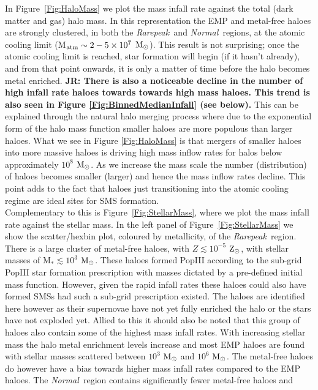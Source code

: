 \documentclass[twocolumn,iop,revtex4]{openjournal}
\newcommand{\msolar} {$\rm{M_{\odot}}~$}
\newcommand{\msolarc} {$\rm{M_{\odot}}$}
\newcommand{\zsolarc} {$\rm{Z_{\odot}}$}
\newcommand{\rarepeak} {\textit{Rarepeak~}}
\newcommand{\normal} {\textit{Normal~}}
\def\jr#1{{\color{blue} \bf JR:  #1}}
\begin{document}
In Figure~\ref{Fig:HaloMass} we plot the mass infall rate against the total (dark matter
and gas) halo mass. In this representation the EMP and metal-free haloes are strongly clustered, in both
the \rarepeak and \normal regions, at the atomic cooling limit (M$_{\rm atm} \sim 2 - 5 \times 10^7$
\msolarc). This result is not surprising; once the atomic cooling limit is reached, star formation
will begin (if it hasn't already), and from that point onwards, it is only a matter of time before
the halo becomes metal enriched. \jr{There is also a noticeable decline in the number of high infall rate
haloes towards towards high mass haloes. This trend is also seen in Figure \ref{Fig:BinnedMedianInfall} (see below).}
This can be explained through the natural halo merging process where due to the exponential form of the halo mass
function smaller haloes are more populous than larger haloes. What we see in Figure \ref{Fig:HaloMass} is that mergers of smaller haloes
into more massive haloes is driving high mass inflow rates for halos below approximately $10^{8}$ \msolarc. As we increase the mass
scale the number (distribution) of haloes becomes smaller (larger) and hence the mass inflow rates decline. This point adds to
the fact that haloes just transitioning into the atomic cooling regime are ideal sites for SMS formation. \\
\indent Complementary to this is Figure~\ref{Fig:StellarMass}, 
where we plot the mass infall rate against the stellar mass. In the left panel of Figure~\ref{Fig:StellarMass}
we show the scatter/hexbin plot, coloured by metallicity, of the
\rarepeak region. There is a large cluster of metal-free haloes, with $Z \lesssim 10^{-5}$ \zsolarc,
with stellar masses of M$_{*} \lesssim 10^3$ \msolarc. These haloes formed PopIII
according to the sub-grid PopIII star formation prescription with masses dictated 
by a pre-defined initial mass function. However, given the rapid infall rates these 
haloes could also have formed SMSs had such a sub-grid prescription existed. The
haloes are identified here however as their supernovae have not yet fully enriched the 
halo or the stars have not exploded yet. Allied to this 
it should also be noted that this group of haloes also contain some of the highest mass infall
rates. With increasing stellar mass the halo metal enrichment levels increase and most EMP haloes
are found with stellar masses scattered between $10^{3}$ \msolar and $10^{6}$ \msolarc. The metal-free haloes
do however have a bias towards higher mass infall rates compared to the EMP haloes.
The \normal region contains significantly fewer metal-free haloes and
\end{document}
